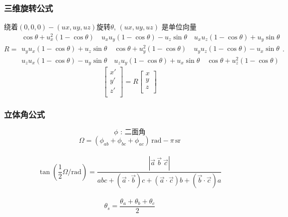\begin{small}
\begin{spacing}{0.5}
\subsubsection{三维旋转公式}
绕着$(0,0,0)-(ux,uy,uz)$旋转$\theta$, $(ux,uy,uz)$ 是单位向量
\[
R = \begin{smallmatrix} \cos \theta +u_x^2 \left(1-\cos \theta\right) \quad u_x u_y \left(1-\cos \theta\right) - u_z \sin \theta \quad u_x u_z \left(1-\cos \theta\right) + u_y \sin \theta \\ u_y u_x \left(1-\cos \theta\right) + u_z \sin \theta \quad \cos \theta + u_y^2\left(1-\cos \theta\right) \quad u_y u_z \left(1-\cos \theta\right) - u_x \sin \theta \\ u_z u_x \left(1-\cos \theta\right) - u_y \sin \theta \quad u_z u_y \left(1-\cos \theta\right) + u_x \sin \theta \quad \cos \theta + u_z^2\left(1-\cos \theta\right) 
\end{smallmatrix}.
\]
\[
\begin{bmatrix}
x' \\
y' \\
z' \\
\end{bmatrix} = R
\begin{bmatrix}
x \\
y \\
z \\
\end{bmatrix}
\]
\subsubsection{立体角公式}
\[ \phi \text{ : 二面角}\] 
\[ \Omega = \left(\phi_{ab} + \phi_{bc} + \phi_{ac}\right)\,\mathrm{rad} - \pi\,\mathrm{sr} \]\\
\[\tan \left( \frac{1}{2} \Omega/\mathrm{rad} \right) =
  \frac{\left|\vec a\ \vec b\ \vec c\right|}{abc + \left(\vec a \cdot \vec b\right)c + \left(\vec a \cdot \vec c\right)b + \left(\vec b \cdot \vec c\right)a}\]\\
\[\theta_s = \frac {\theta_a + \theta_b + \theta_c}{2}\]\\

\end{spacing}
\end{small}
